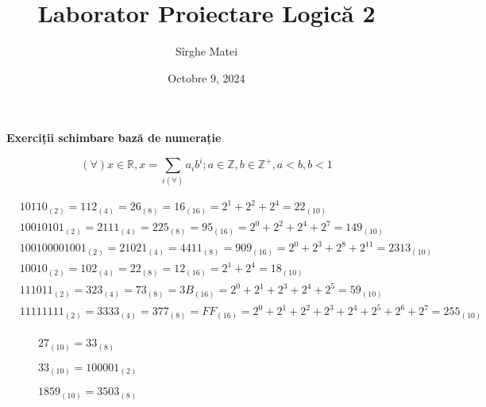 \documentclass[12pt]{article}
\title{\bfseries Laborator Proiectare Logică 2}
\author{Sîrghe Matei}
\date{Octobre 9, 2024}
\begin{document}
\maketitle

\begin{center}
    \large \textbf{Exerciții schimbare bază de numerație}
\end{center}

\begin{equation}
    (\forall) x \in \mathbb{R} , x= \sum_{i(\forall)} a_{i} b^{i} ; a \in \mathbb{Z}, b \in \mathbb{Z^{+}}, a<b, b<1
\end{equation}

\begin{align*}
    & 10110_{(2)} = 112_{(4)} = 26_{(8)} = 16_{(16)} = 2^{1} + 2^{2} + 2^{4}= 22_{(10)}\\
    & 10010101_{(2)} = 2111_{(4)} = 225_{(8)} = 95_{(16)} = 2^{0}+2^{2}+2^{4}+2^{7} = 149_{(10)}\\
    & 100100001001_{(2)}= 21021_{(4)} =4411_{(8)}=909_{(16)}=2^{0}+ 2^{3}+ 2^{8}+ 2^{11}=2313_{(10)}\\
    & 10010_{(2)}=102_{(4)}=22_{(8)}=12_{(16)}=2^{1}+ 2^{4}=18_{(10)}\\
    & 111011_{(2)}=323_{(4)}=73_{(8)}=3B_{(16)}=2^{0}+2^{1}+2^{3}+2^{4}+2^{5}=59_{(10)}\\
    & 11111111_{(2)}=3333_{(4)}=377_{(8)}=FF_{(16)}=2^{0}+2^{1}+2^{2}+2^{3}+2^{4}+2^{5}+2^{6}+2^{7}=255_{(10)}\\
\end{align*}

\begin{figure}[h!]
    \begin{minipage}{0.3\textwidth}
        $27_{(10)}=33_{(8)}$
    \end{minipage}
    \hfill
    \begin{minipage}{0.3\textwidth}
        $33_{(10)}=100001_{(2)}$
    \end{minipage}
    \hfill
    \begin{minipage}{0.3\textwidth}
        $1859_{(10)}=3503_{(8)}$
    \end{minipage}
\end{figure}
\end{document}
